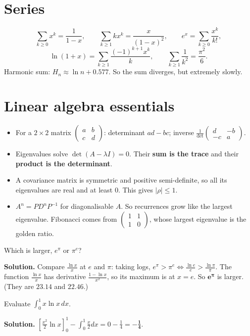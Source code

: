 \documentclass[11pt,a4paper,openany]{report}
\begin{document}
\section{Series}
\[\sum_{k\ge0}x^k=\frac1{1-x},\qquad\sum_{k\ge1}kx^k=\frac x{(1-x)^2},\qquad e^x=\sum_{k\ge0}\frac{x^k}{k!},\]
\[\ln(1+x)=\sum_{k\ge1}\frac{(-1)^{k+1}x^k}k,\qquad\sum_{k\ge1}\frac1{k^2}=\frac{\pi^2}6.\]
Harmonic sum: $H_n\approx\ln n+0.577$. So the sum diverges, but extremely slowly.

\section{Linear algebra essentials}
\begin{itemize}[nosep]
\item For a $2\times2$ matrix $\begin{pmatrix}a&b\\c&d\end{pmatrix}$: determinant $ad-bc$; inverse $\frac1{\det}\begin{pmatrix}d&-b\\-c&a\end{pmatrix}$.
\item Eigenvalues solve $\det(A-\lambda I)=0$. Their \textbf{sum is the trace} and their \textbf{product is the determinant}.
\item A covariance matrix is symmetric and positive semi-definite, so all its eigenvalues are real and at least 0. This gives $|\rho|\le1$.
\item $A^n=PD^nP^{-1}$ for diagonalisable $A$. So recurrences grow like the largest eigenvalue. Fibonacci comes from $\begin{pmatrix}1&1\\1&0\end{pmatrix}$, whose largest eigenvalue is the golden ratio.
\end{itemize}

\begin{example}
Which is larger, $e^\pi$ or $\pi^e$?

\textbf{Solution.} Compare $\frac{\ln x}x$ at $e$ and $\pi$: taking logs, $e^\pi>\pi^e\iff\frac{\ln e}e>\frac{\ln\pi}\pi$. The function $\frac{\ln x}x$ has derivative $\frac{1-\ln x}{x^2}$, so its maximum is at $x=e$. So $\mathbf{e^\pi}$ is larger. (They are $23.14$ and $22.46$.)
\end{example}

\begin{example}
Evaluate $\int_0^1x\ln x\,dx$.

\textbf{Solution.} $\left[\frac{x^2}2\ln x\right]_0^1-\int_0^1\frac x2dx=0-\frac14=\mathbf{-\frac14}$.
\end{example}
\end{document}
